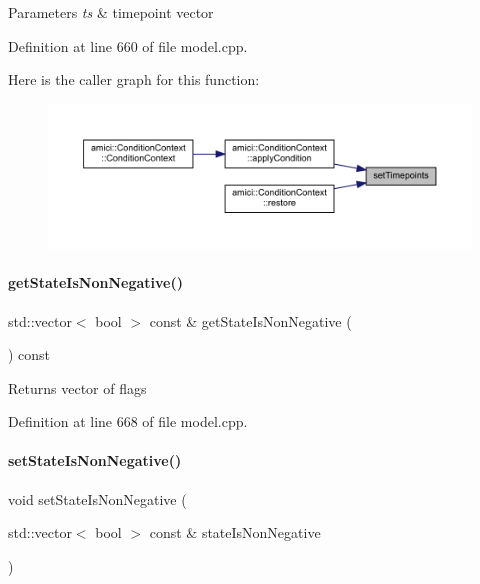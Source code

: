 \begin{DoxyParams}{Parameters}
{\em ts} & timepoint vector \\
\hline
\end{DoxyParams}


Definition at line 660 of file model.\+cpp.

Here is the caller graph for this function\+:
\nopagebreak
\begin{figure}[H]
\begin{center}
\leavevmode
\includegraphics[width=350pt]{classamici_1_1_model_a50f9642f9bcb883dbd3925c85abc4c24_icgraph}
\end{center}
\end{figure}
\mbox{\label{classamici_1_1_model_a25b1fc032e0065d80d8bd1041ab84bbf}} 
\paragraph{\texorpdfstring{getStateIsNonNegative()}{getStateIsNonNegative()}}
{\footnotesize\ttfamily std\+::vector$<$ bool $>$ const  \& get\+State\+Is\+Non\+Negative (\begin{DoxyParamCaption}{ }\end{DoxyParamCaption}) const}

\begin{DoxyReturn}{Returns}
vector of flags 
\end{DoxyReturn}


Definition at line 668 of file model.\+cpp.

\mbox{\label{classamici_1_1_model_a0a50693322a9383d8e98390d9894e841}} 
\paragraph{\texorpdfstring{setStateIsNonNegative()}{setStateIsNonNegative()}}
{\footnotesize\ttfamily void set\+State\+Is\+Non\+Negative (\begin{DoxyParamCaption}\item[{std\+::vector$<$ bool $>$ const \&}]{state\+Is\+Non\+Negative }\end{DoxyParamCaption})}


